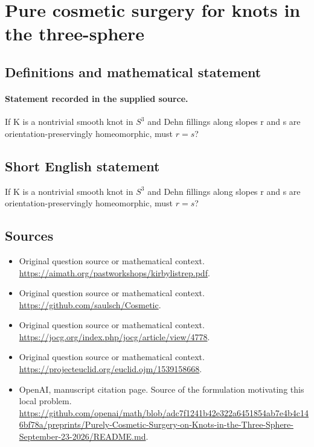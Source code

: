\documentclass[11pt]{article}
\begin{document}
\section*{Pure cosmetic surgery for knots in the three-sphere}\label{30007506}
\subsection{Definitions and mathematical statement}
\paragraph{Statement recorded in the supplied source.}
If K is a nontrivial smooth knot in $S^{3}$ and Dehn fillings along slopes r and s are orientation-preservingly homeomorphic, must $r=s$?
\subsection{Short English statement}
If K is a nontrivial smooth knot in $S^{3}$ and Dehn fillings along slopes r and s are orientation-preservingly homeomorphic, must $r=s$?
\subsection{Sources}
\begin{itemize}
\item[S1] Original question source or mathematical context.
\url{https://aimath.org/pastworkshops/kirbylistrep.pdf}.
\item[S2] Original question source or mathematical context.
\url{https://github.com/saulsch/Cosmetic}.
\item[S3] Original question source or mathematical context.
\url{https://jocg.org/index.php/jocg/article/view/4778}.
\item[S4] Original question source or mathematical context.
\url{https://projecteuclid.org/euclid.ojm/1539158668}.
\item[S6] OpenAI, manuscript citation page. Source of the formulation motivating this local problem.
\url{https://github.com/openai/math/blob/adc7f1241b42e322a6451854ab7e4b4c146bf78a/preprints/Purely-Cosmetic-Surgery-on-Knots-in-the-Three-Sphere-September-23-2026/README.md}.
\end{itemize}
\end{document}
